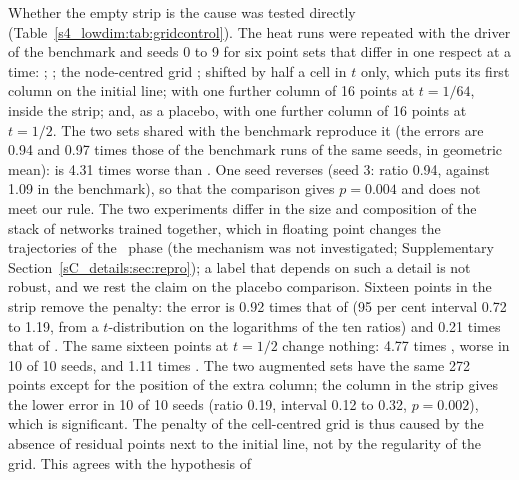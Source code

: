 Whether the empty strip is the cause was tested directly
(Table~\ref{s4_lowdim:tab:gridcontrol}). The heat runs were repeated with the driver of the
benchmark and seeds 0 to 9 for six point sets that differ in one respect at a time:
; ; the node-centred grid ; 
shifted by half a cell in $t$ only, which puts its first column on the initial line;
 with one further column of 16 points at $t=1/64$, inside the strip; and, as a
placebo,  with one further column of 16 points at $t=1/2$.
The two sets shared with the benchmark reproduce it (the errors are 0.94 and 0.97 times
those of the benchmark runs of the same seeds, in geometric mean):  is 4.31
times worse than . One seed reverses (seed 3: ratio 0.94, against 1.09 in the
benchmark), so that the comparison gives $p=0.004$ and does not meet our rule. The two
experiments differ in the size and composition of the stack of networks trained together, which
in floating point changes the trajectories of the \LBFGS\ phase (the mechanism was not
investigated; Supplementary Section~\ref{sC_details:sec:repro}); a label that depends on such a
detail is not robust, and we rest the claim on the placebo comparison.
Sixteen points in the strip remove the penalty: the error is 0.92 times that of
 (95 per cent interval 0.72 to 1.19, from a $t$-distribution on the
logarithms of the ten ratios) and 0.21 times that of . The same sixteen
points at $t=1/2$ change nothing: 4.77 times , worse in 10 of 10 seeds, and
1.11 times . The two augmented sets have the same 272 points except for the
position of the extra column; the column in the strip gives the lower error in 10 of 10
seeds (ratio 0.19, interval 0.12 to 0.32, $p=0.002$), which is significant. The penalty of
the cell-centred grid is thus caused by the absence of residual points next to the initial
line, not by the regularity of the grid. This agrees with the hypothesis of
